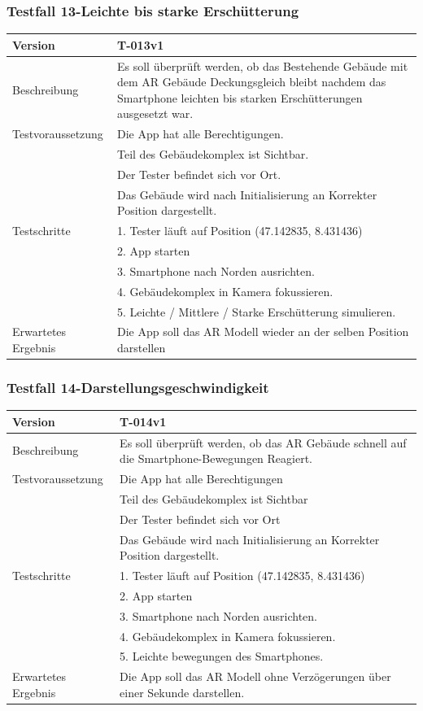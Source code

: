 \documentclass[a4paper]{scrreprt}
\begin{document}
\subsubsection{Testfall 13-Leichte bis starke Erschütterung}
\begin{tabularx}{\textwidth}{|l|X|}
\hline 
	Version &
	T-013v1 \\ 
\hline 
	Beschreibung & 
	Es soll überprüft werden, ob das Bestehende Gebäude mit dem AR Gebäude Deckungsgleich bleibt nachdem das Smartphone leichten bis starken Erschütterungen ausgesetzt war. \\ 
\hline 
	Testvoraussetzung &
	Die App hat alle Berechtigungen. \\ &
	Teil des Gebäudekomplex ist Sichtbar. \\ &
	Der Tester befindet sich vor Ort. \\ &
	Das Gebäude wird nach Initialisierung an Korrekter Position dargestellt. \\
\hline 
	Testschritte & 
		1. Tester läuft auf Position (47.142835, 8.431436) \\ &
		2. App starten \\ &
		3. Smartphone nach Norden ausrichten. \\ &
		4. Gebäudekomplex in Kamera fokussieren. \\ &
		5. Leichte / Mittlere / Starke Erschütterung simulieren. \\
\hline
	Erwartetes Ergebnis &
	Die App soll das AR Modell wieder an der selben Position darstellen \\ 
\hline 
\end{tabularx}

\subsubsection{Testfall 14-Darstellungsgeschwindigkeit}
\begin{tabularx}{\textwidth}{|l|X|}
\hline 
	Version &
	T-014v1 \\ 
\hline 
	Beschreibung & 
	Es soll überprüft werden, ob das AR Gebäude schnell auf die Smartphone-Bewegungen Reagiert. \\ 
\hline 
	Testvoraussetzung &
	Die App hat alle Berechtigungen \\ &
	Teil des Gebäudekomplex ist Sichtbar \\ &
	Der Tester befindet sich vor Ort \\ &
	Das Gebäude wird nach Initialisierung an Korrekter Position dargestellt. \\
\hline 
	Testschritte & 
		1. Tester läuft auf Position (47.142835, 8.431436) \\ &
		2. App starten \\ &
		3. Smartphone nach Norden ausrichten. \\ &
		4. Gebäudekomplex in Kamera fokussieren. \\ &
		5. Leichte bewegungen des Smartphones. \\
\hline
	Erwartetes Ergebnis &
	Die App soll das AR Modell ohne Verzögerungen über einer Sekunde darstellen. \\ 
\hline 
\end{tabularx}
\end{document}
